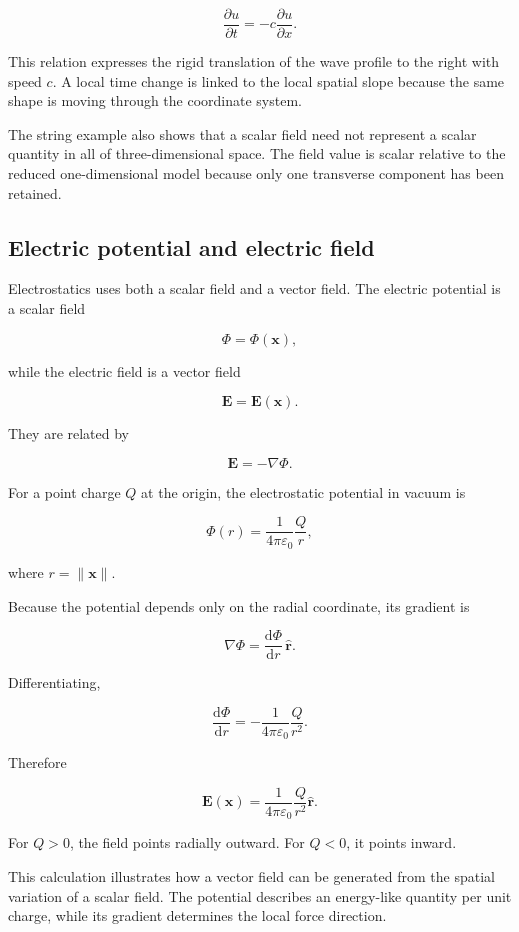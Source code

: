 \[
\frac{\partial u}{\partial t}
=
-c\frac{\partial u}{\partial x}.
\]

This relation expresses the rigid translation of the wave profile to the right with speed \(c\). A local time change is linked to the local spatial slope because the same shape is moving through the coordinate system.

The string example also shows that a scalar field need not represent a scalar quantity in all of three-dimensional space. The field value is scalar relative to the reduced one-dimensional model because only one transverse component has been retained.

\subsection{Electric potential and electric field}

Electrostatics uses both a scalar field and a vector field. The electric potential is a scalar field

\[
\Phi=\Phi(\mathbf{x}),
\]

while the electric field is a vector field

\[
\mathbf{E}=\mathbf{E}(\mathbf{x}).
\]

They are related by

\[
\mathbf{E}=-\nabla\Phi.
\]

For a point charge \(Q\) at the origin, the electrostatic potential in vacuum is

\[
\Phi(r)
=
\frac{1}{4\pi\varepsilon_{0}}
\frac{Q}{r},
\]

where \(r=\lVert\mathbf{x}\rVert\).

Because the potential depends only on the radial coordinate, its gradient is

\[
\nabla\Phi
=
\frac{\mathrm{d}\Phi}{\mathrm{d}r}\,\widehat{\mathbf{r}}.
\]

Differentiating,

\[
\frac{\mathrm{d}\Phi}{\mathrm{d}r}
=
-\frac{1}{4\pi\varepsilon_{0}}
\frac{Q}{r^{2}}.
\]

Therefore

\[
\boxed{
\mathbf{E}(\mathbf{x})
=
\frac{1}{4\pi\varepsilon_{0}}
\frac{Q}{r^{2}}
\widehat{\mathbf{r}}
}.
\]

For \(Q>0\), the field points radially outward. For \(Q<0\), it points inward.

This calculation illustrates how a vector field can be generated from the spatial variation of a scalar field. The potential describes an energy-like quantity per unit charge, while its gradient determines the local force direction.

